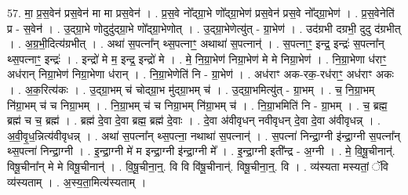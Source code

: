 \documentclass[17pt]{extarticle}
\begin{document}
57. मा॒ प्र॒स॒वेन॑ प्रस॒वेन॑ मा मा प्रस॒वेन॑ । . प्र॒स॒वे नो᳚द्ग्रा॒भे णो᳚द्ग्रा॒भेण॑ प्रस॒वेन॑ प्रस॒वे नो᳚द्ग्रा॒भेण॑ । . प्र॒स॒वेनेति॑ प्र - स॒वेन॑ । . उ॒द्ग्रा॒भे णोदुदु॑द्ग्रा॒भे णो᳚द्ग्रा॒भेणोत् । . उ॒द्ग्रा॒भेणेत्यु॑त् - ग्रा॒भेण॑ । . उद॑ग्रभी दग्रभी॒ दुदु द॑ग्रभीत् । . अ॒ग्र॒भी॒दित्य॑ग्रभीत् । . अथा॑ स॒पत्ना᳚न् थ्स॒पत्नाꣳ॒॒ अथाथा॑ स॒पत्नान्॑ । . स॒पत्नाꣳ॒॒ इन्द्र॒ इन्द्रः॑ स॒पत्ना᳚न् थ्स॒पत्नाꣳ॒॒ इन्द्रः॑ । . इन्द्रो॑ मे म॒ इन्द्र॒ इन्द्रो॑ मे । . मे॒ नि॒ग्रा॒भेण॑ निग्रा॒भेण॑ मे मे निग्रा॒भेण॑ । . नि॒ग्रा॒भेणा ध॑राꣳ॒॒ अध॑रान् निग्रा॒भेण॑ निग्रा॒भेणा ध॑रान् । . नि॒ग्रा॒भेणेति॑ नि - ग्रा॒भेण॑ । . अध॑राꣳ अक-रक॒-रध॑राꣳ॒॒ अध॑राꣳ अकः । . अ॒क॒रित्य॑कः । . उ॒द्ग्रा॒भम् च॑ चोद्ग्रा॒भ मु॑द्ग्रा॒भम् च॑ । . उ॒द्ग्रा॒भमित्यु॑त् - ग्रा॒भम् । . च॒ नि॒ग्रा॒भम् नि॑ग्रा॒भम् च॑ च निग्रा॒भम् । . नि॒ग्रा॒भम् च॑ च निग्रा॒भम् नि॑ग्रा॒भम् च॑ । . नि॒ग्रा॒भमिति॑ नि - ग्रा॒भम् । . च॒ ब्रह्म॒ ब्रह्म॑ च च॒ ब्रह्म॑ । . ब्रह्म॑ दे॒वा दे॒वा ब्रह्म॒ ब्रह्म॑ दे॒वाः । . दे॒वा अ॑वीवृधन् नवीवृधन् दे॒वा दे॒वा अ॑वीवृधन्न् । . अ॒वी॒वृ॒ध॒न्नित्य॑वीवृधन्न् । . अथा॑ स॒पत्ना᳚न् थ्स॒पत्ना॒ नथाथा॑ स॒पत्नान्॑ । . स॒पत्ना॑ निन्द्रा॒ग्नी इ॑न्द्रा॒ग्नी स॒पत्ना᳚न् थ्स॒पत्ना॑ निन्द्रा॒ग्नी । . इ॒न्द्रा॒ग्नी मे॑ म इन्द्रा॒ग्नी इ॑न्द्रा॒ग्नी मे᳚ । . इ॒न्द्रा॒ग्नी इती᳚न्द्र - अ॒ग्नी । . मे॒ वि॒षू॒चीनान्॑. विषू॒चीना᳚न् मे मे विषू॒चीनान्॑ । . वि॒षू॒चीना॒न्॒. वि वि वि॑षू॒चीनान्॑. विषू॒चीना॒न्॒. वि । . व्य॑स्यता मस्यतां॒ ॅवि व्य॑स्यताम् । . अ॒स्य॒ता॒मित्य॑स्यताम् । \newline
\end{document}
